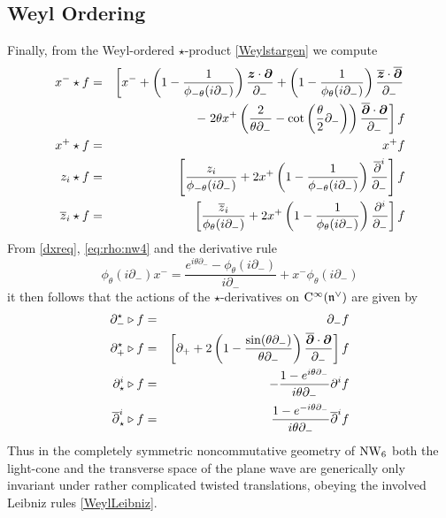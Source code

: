 \subsection{Weyl Ordering}
\label{Weylderiv}
Finally, from the Weyl-ordered $\star$-product \eqref{Weylstargen} we compute
\begin{eqnarray}
  \nonumber
  x^-\star f&=&\left[x^-+\left(1-\frac1{\phi_{-\theta}( i\partial_-)}
\right) \frac{{{\boldsymbol {z} }}\cdot{{\boldsymbol {\partial} }}}{\partial_-}+
\left(1-\frac1{\phi_{\theta}( i\partial_-)}
\right) \frac{\overline{{{\boldsymbol {z} }}}\cdot\overline{{{\boldsymbol {\partial} }}}}{\partial_-}
\right.\\\nonumber &&\qquad-\left.2\theta x^+\left(\frac{2}
{\theta \partial_-}-\cot\left( \frac\theta2 \partial_- 
\right)\right) \frac{\overline{{{\boldsymbol {\partial} }}}
\cdot{{\boldsymbol {\partial} }}}{\partial_-}\right] f \\\nonumber
x^+\star f&=&x^+ f \\\nonumber
z_i\star f&=&\left[\frac{z_i}{\phi_{-\theta}( i\partial_-)}+
2x^+ \left(1-\frac1{\phi_{-\theta}( i\partial_-)}\right) 
\frac{\overline{\partial}^{ i}}{\partial_-}\right] f
\\ \overline{z}_i\star f&=&
\left[\frac{\overline{z}_i}{\phi_{\theta}( i\partial_-)}+
2x^+ \left(1-\frac1{\phi_{\theta}( i\partial_-)}\right) 
\frac{\partial^i}{\partial_-}\right] f
  \label{Weylxfprods}
\end{eqnarray}
From \eqref{dxreq}, \eqref{eq:rho:nw4} and the derivative rule
\begin{equation}
  \label{derivrule2}
  \phi_\theta(i\partial_-)x^-=\frac{e^{i\theta\partial_-}
    -\phi_\theta(i\partial_-)}{i\partial_-}
  +x^-\phi_\theta(i\partial_-)
\end{equation}
it then follows that the actions of the $\star$-derivatives on
${\rm C}^\infty({\mathfrak n}^\vee)$ are given by
\begin{eqnarray}
  \label{Weylderivs}
  \partial_-^\star\triangleright f&=&\partial_-f \\\nonumber
  \partial_+^\star\triangleright f&=&\left[\partial_++2 
  \left(1-\frac{\sin(\theta \partial_-)}{\theta \partial_-}
  \right) \frac{\overline{{{\boldsymbol {\partial} }}}\cdot{{\boldsymbol {\partial} }}}{\partial_-}
\right]f \\\nonumber \partial_\star^i\triangleright f&=&
-\frac{1- e^{ i\theta \partial_-}}{ i\theta \partial_-} 
\partial^if \\\nonumber \overline{\partial}_\star^{ i}
\triangleright f&=&\frac{1- e^{- i\theta \partial_-}}
{ i\theta \partial_-} \overline{\partial}^{ i}f
\end{eqnarray}
Thus in the completely symmetric noncommutative geometry of $\operatorname{NW}_6$ both the
light-cone and the transverse space of the plane wave are generically only
invariant under rather complicated twisted translations, obeying the involved
Leibniz rules \eqref{WeylLeibniz}.

